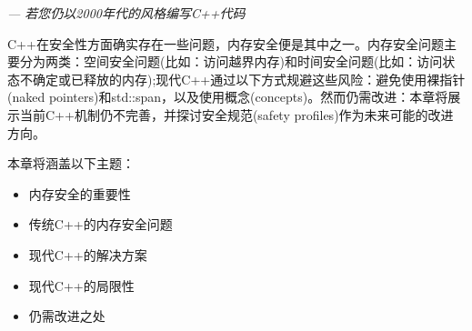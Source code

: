 \begin{flushright}
\textit{--- 若您仍以2000年代的风格编写C++代码}
\end{flushright}

C++在安全性方面确实存在一些问题，内存安全便是其中之一。内存安全问题主要分为两类：空间安全问题(比如：访问越界内存)和时间安全问题(比如：访问状态不确定或已释放的内存);现代C++通过以下方式规避这些风险：避免使用裸指针(naked pointers)和std::span，以及使用概念(concepts)。然而仍需改进：本章将展示当前C++机制仍不完善，并探讨安全规范(safety profiles)作为未来可能的改进方向。

本章将涵盖以下主题：

\begin{itemize}
\item 
内存安全的重要性

\item 
传统C++的内存安全问题

\item 
现代C++的解决方案

\item 
现代C++的局限性

\item 
仍需改进之处
\end{itemize}















